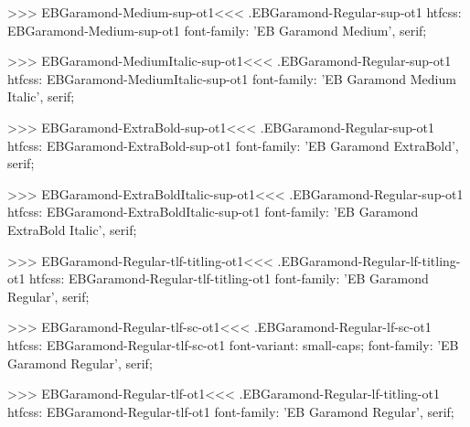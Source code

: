{{{{{{{>>>
\<EBGaramond-Medium-sup-ot1\><<<
.EBGaramond-Regular-sup-ot1
htfcss:  EBGaramond-Medium-sup-ot1  font-family: 'EB Garamond Medium', serif;

>>>
\<EBGaramond-MediumItalic-sup-ot1\><<<
.EBGaramond-Regular-sup-ot1
htfcss:  EBGaramond-MediumItalic-sup-ot1  font-family: 'EB Garamond Medium Italic', serif;

>>>
\<EBGaramond-ExtraBold-sup-ot1\><<<
.EBGaramond-Regular-sup-ot1
htfcss:  EBGaramond-ExtraBold-sup-ot1  font-family: 'EB Garamond ExtraBold', serif;

>>>
\<EBGaramond-ExtraBoldItalic-sup-ot1\><<<
.EBGaramond-Regular-sup-ot1
htfcss:  EBGaramond-ExtraBoldItalic-sup-ot1  font-family: 'EB Garamond ExtraBold Italic', serif;

>>>
\<EBGaramond-Regular-tlf-titling-ot1\><<<
.EBGaramond-Regular-lf-titling-ot1
htfcss:  EBGaramond-Regular-tlf-titling-ot1  font-family: 'EB Garamond Regular', serif;

>>>
\<EBGaramond-Regular-tlf-sc-ot1\><<<
.EBGaramond-Regular-lf-sc-ot1
htfcss:  EBGaramond-Regular-tlf-sc-ot1  font-variant: small-caps; font-family: 'EB Garamond Regular', serif;

>>>
\<EBGaramond-Regular-tlf-ot1\><<<
.EBGaramond-Regular-lf-titling-ot1
htfcss:  EBGaramond-Regular-tlf-ot1  font-family: 'EB Garamond Regular', serif;

}}}}}}}
